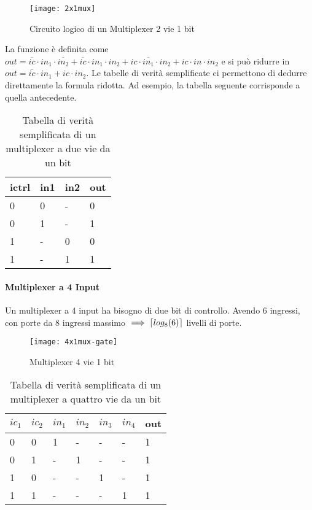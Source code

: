 \begin{figure}
	\centering
	\texttt{[image: 2x1mux]}
	\caption{Circuito logico di un Multiplexer 2 vie 1 bit}
\end{figure}



La funzione è definita come $ out = \overbar{ic} \cdot in_1 \cdot \overbar{in_2} + \overbar{ic} \cdot in_1 \cdot in_2 + ic \cdot \overbar{in_1} \cdot in_2 + ic \cdot in \cdot in_2 $ e si può ridurre in $ out = \overbar{ic} \cdot in_1 + ic \cdot in_2 $. Le tabelle di verità semplificate ci permettono di dedurre direttamente la formula ridotta. Ad esempio, la tabella seguente corrisponde a quella antecedente.
\begin{table}[H]
	\centering
	\caption{Tabella di verità semplificata di un multiplexer a due vie da un bit}
	\label{tab:multiplexer2}
	\begin{tabular}{|lll|l|}
		\hline
		ictrl & in1 & in2 & out \\ \hline
		0     & 0   & -   & 0   \\
		0     & 1   & -   & 1   \\ \hline
		1     & -   & 0   & 0   \\
		1     & -   & 1   & 1   \\ \hline
	\end{tabular}
\end{table}

\paragraph{Multiplexer a 4 Input}
Un multiplexer a 4 input ha bisogno di due bit di controllo. Avendo 6 ingressi, con porte da 8 ingressi massimo $ \implies \ceil*{ log_8(6)} $ livelli di porte.


\begin{figure}
	\centering
	\texttt{[image: 4x1mux-gate]}
	\caption{Multiplexer 4 vie 1 bit}
\end{figure}

\begin{table}[H]
	\centering
	\caption{Tabella di verità semplificata di un multiplexer a quattro vie da un bit}
	\label{tab:multiplexer3}
	\begin{tabular}{|llllll|l|}
		\hline
		$ ic_1 $ & $ ic_2 $ & $ in_1 $ & $ in_2 $ & $ in_3 $ & $ in_4 $ & out \\ \hline
		0     & 0     & 1     & -     & -     & -     & 1   \\ \hline
		0     & 1     & -     & 1     & -     & -     & 1   \\ \hline
		1     & 0     & -     & -     & 1     & -     & 1   \\ \hline
		1     & 1     & -     & -     & -     & 1     & 1   \\ \hline
	\end{tabular}
\end{table}


